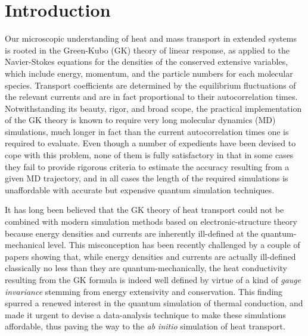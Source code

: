 \section{Introduction}
\label{sec:intro}
Our microscopic understanding of heat and mass transport in extended systems is rooted in the Green-Kubo (GK) theory of linear response,\cite{Green1954,Kubo1957} as applied to the Navier-Stokes equations for the densities of the conserved extensive variables,\cite{Kadanoff1963,Forster1975} which include energy, momentum, and the particle numbers for each molecular species. Transport coefficients are determined by the equilibrium fluctuations of the relevant currents and are in fact proportional to their autocorrelation times. Notwithstanding its beauty, rigor, and broad scope, the practical implementation of the GK theory is known to require very long molecular dynamics (MD) simulations, much longer in fact than the  current autocorrelation times one is required to evaluate.\cite{Schelling2002,Nevins2007,Jones2012,Zhang2015,Oliveira2017} Even though a number of expedients have been devised to cope with this problem,\cite{Jones2012,Oliveira2017,Chen2010} none of them is fully satisfactory in that in some cases they fail to provide rigorous criteria to estimate the accuracy resulting from a given MD trajectory, and in all cases the length of the required simulations is unaffordable with accurate but expensive quantum simulation techniques.\cite{Carbogno2017}

It has long been believed that the GK theory of heat transport could not be combined with modern simulation methods based on electronic-structure theory because energy densities and currents are inherently ill-defined at the quantum-mechanical level.\cite{Stackhouse2010b} This misconception has been recently challenged by a couple of papers showing that, while energy densities and currents are actually ill-defined classically no less than they are quantum-mechanically, the heat conductivity resulting from the GK formula is indeed well defined by virtue of a kind of \emph{gauge invariance} stemming from energy extensivity and conservation.\cite{Marcolongo2016,Ercole2016} This finding spurred a renewed interest in the quantum simulation of thermal conduction,\cite{Carbogno2017,Kang2017} and made it urgent to devise a data-analysis technique to make these simulations affordable, thus paving the way to the \emph{ab initio} simulation of heat transport.

